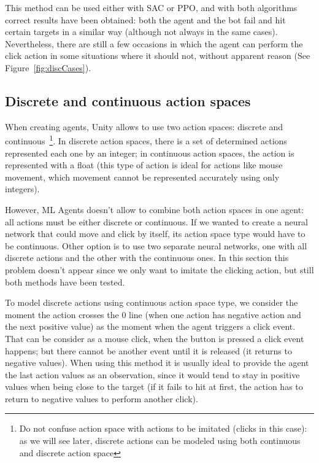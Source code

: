 This method can be used either with SAC or PPO, and with both algorithms correct results have been obtained: both the agent and the bot fail and hit certain targets in a similar way (although not always in the same cases). Nevertheless, there are still a few occasions in which the agent can perform the click action in some situations where it should not, without apparent reason (See Figure~\ref{fig:discCases}).


\subsection{Discrete and continuous action spaces}
\label{sec:discVScont}

When creating agents, Unity allows to use two action spaces: discrete and continuous~\footnote{Do not confuse action space with actions to be imitated (clicks in this case): as we will see later, discrete actions can be modeled using both continuous and discrete action space}. In discrete action spaces, there is a set of determined actions represented each one by an integer; in continuous action spaces, the action is represented with a float (this type of action is ideal for actions like mouse movement, which movement cannot be represented accurately using only integers).

However, ML Agents doesn't allow to combine both action spaces in one agent: all actions must be either discrete or continuous. If we wanted to create a neural network that could move and click by itself, its action space type would have to be continuous. Other option is to use two separate neural networks, one with all discrete actions and the other with the continuous ones. In this section this problem doesn't appear since we only want to imitate the clicking action, but still both methods have been tested.

To model discrete actions using continuous action space type, we consider the moment the action crosses the 0 line (when one action has negative action and the next positive value) as the moment when the agent triggers a click event. That can be consider as a mouse click, when the button is pressed a click event happens; but there cannot be another event until it is released (it returns to negative values). When using this method it is usually ideal to provide the agent the last action values as an observation, since it would tend to stay in positive values when being close to the target (if it fails to hit at first, the action has to return to negative values to perform another click).

